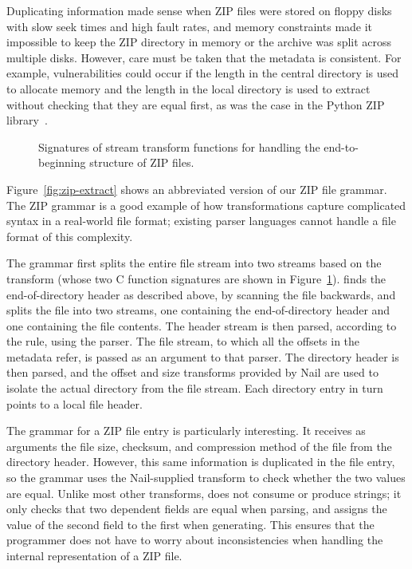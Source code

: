 

Duplicating information made sense when ZIP files were stored on floppy
disks with slow seek times and high fault rates, and memory constraints
made it impossible to keep the ZIP directory in memory or the archive
was split across multiple disks.  However, care must be taken that the
metadata is consistent. For example, vulnerabilities could occur if
the length in the central directory is used to allocate memory and the
length in the local directory is used to extract without checking that
they are equal first, as was the case in the Python ZIP
library~\cite{cve-python-zip-maybe}.

\begin{figure}[tb]
\smaller[0.5]

\caption{Signatures of stream transform functions for handling the
end-to-beginning structure of ZIP files.}
\label{fig:zip-eod-xform}
\end{figure}

Figure~\ref{fig:zip-extract} shows an abbreviated version of our ZIP
file grammar.  The ZIP grammar is a good example of how transformations
capture complicated syntax in a real-world file format; existing parser
languages cannot handle a file format of this complexity.

The  grammar first splits the entire file stream into two
streams based on the  transform (whose two
C function signatures are shown in Figure~\ref{fig:zip-eod-xform}).
 finds the end-of-directory header
as described above, by scanning the file backwards, and splits the
file into two streams, one containing the end-of-directory header and
one containing the file contents.  The header stream is then parsed,
according to the  rule, using the 
parser.  The file stream, to which all the offsets in the metadata refer,
is passed as an argument to that parser.  The directory header is then
parsed, and the offset and size transforms provided by Nail are used
to isolate the actual directory from the file stream.  Each directory
entry in turn points to a local file header.

The  grammar for a ZIP file entry is particularly interesting.
It receives as arguments the file size, checksum, and compression method
of the file from the directory header.  However, this same information
is duplicated in the file entry, so the grammar uses the Nail-supplied
 transform to check whether the two values are equal. Unlike
most other transforms,  does not consume or produce strings; it
only checks that two dependent fields are equal when parsing, and assigns
the value of the second field to the first when generating.  This ensures
that the programmer does not have to worry about inconsistencies when
handling the internal representation of a ZIP file.

